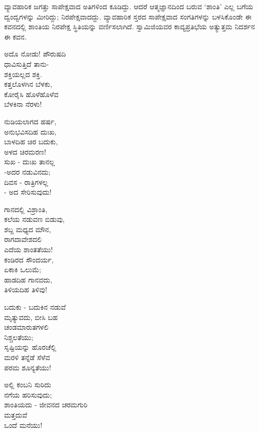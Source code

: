 ವ್ಯಾವಹಾರಿಕ ಜಗತ್ತು ಸಾಪೇಕ್ಷವಾದ ಅತಿಗಳಿಂದ ಕೂಡಿದ್ದು. ಆದರೆ ಆತ್ಮಜ್ಞಾನದಿಂದ ಬರುವ ‘ಶಾಂತಿ’ ಎಲ್ಲ ಬಗೆಯ ದ್ವಂದ್ವಗಳನ್ನು ಮೀರಿದ್ದು; ನಿರಪೇಕ್ಷವಾದದ್ದು. ವ್ಯಾವಹಾರಿಕ ಸ್ತರದ ಸಾಪೇಕ್ಷವಾದ ಸಂಗತಿಗಳನ್ನು ಬಳಸಿಕೊಂಡೇ ಈ ಕವನದಲ್ಲಿ ಶಾಂತಿಯ ನಿರಪೇಕ್ಷ ಸ್ಥಿತಿಯನ್ನು ವರ್ಣಿಸಲಾಗಿದೆ. ಸ್ವಾಮಿಜಿಯವರ ಕಾವ್ಯಪ್ರತಿಭೆಯ ಅತ್ಯುತ್ತಮ ನಿದರ್ಶನ ಈ ಕವನ.

\begin{myquote}
ಅದೊ ನೋಡು! ಪೌರುಷದಿ\\ಧಾವಿಸುತ್ತಿದೆ ತಾನು-\\ಶಕ್ತಿಯಲ್ಲದ ಶಕ್ತಿ.\\ಕತ್ತಲೊಳಗಿನ ಬೆಳಕು,\\ಕೋರೈಸಿ ಹೊಳೆಹೊಳೆವ\\ಬೆಳಕಿನಾ ನೆರಳು!
\end{myquote}

\begin{myquote}
ನುಡಿಯಲಾಗದ ಹರ್ಷ,\\ಅನುಭವಿಸದಿಹ ದುಃಖ,\\ಬಾಳದಿಹ ಚಿರ ಬದುಕು,\\ಅಳದ ಚಿರಮರಣ!\\ಸುಖ - ದುಃಖ ತಾನಲ್ಲ\\-ಅದರ ನಡುವಿನದು;\\ದಿವಸ - ರಾತ್ರಿಗಳಲ್ಲ\\- ಅದ ಸೇರಿಸುವುದು!
\end{myquote}

\begin{myquote}
ಗಾನದಲ್ಲಿ ವಿಶ್ರಾಂತಿ,\\ಕಲೆಯ ನಡುವಣ ಬಿಡುವು,\\ಶಬ್ದ ಮಧ್ಯದ ಮೌನ,\\ರಾಗದಾವೇಶದಲಿ\\ಎದೆಯ ಶಾಂತತೆಯು!\\ಕಂಡಿರದ ಸೌಂದರ್ಯ,\\ಏಕಾಕಿ ಒಲುಮೆ;\\ಹಾಡದಿಹ ಗಾನವದು,\\ತಿಳಿಯದಿಹ ತಿಳಿವು!
\end{myquote}

\begin{myquote}
ಬದುಕು - ಬದುಕಿನ ನಡುವೆ\\ಮೃತ್ಯುವದು, ಬೀಸಿ ಬಹ\\ಚಂಡಮಾರುತಗಳಲಿ\\ನಿಶ್ಚಲತೆಯು;\\ಸೃಷ್ಟಿಯನ್ನು ಹೊರಚೆಲ್ಲಿ\\ಮರಳಿ ತನ್ನೆಡೆ ಸೆಳೆವ\\ಪರಮ ಶೂನ್ಯತೆಯು!
\end{myquote}

\begin{myquote}
ಅಲ್ಲಿ ಕಂಬನಿ ಸುರಿದು\\ನಗೆಯ ಹರಿಸುವುದು;\\ಶಾಂತಿಯದು - ಜೀವನದ ಚರಮಗುರಿ\\ಮತ್ತದುವೆ\\ಒಂದೆ ಮನೆಯು!
\end{myquote}

